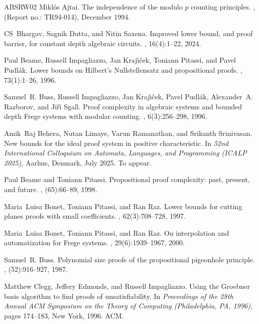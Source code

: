 \documentclass[11pt,letter]{article}
\theoremstyle{remark} %
\let\etalchar\relax %
\begin{document}
{\begin{thebibliography}{ABSRW02}
Mikl\'{o}s Ajtai.
\newblock The independence of the modulo $p$ counting principles.
, (Report no.: TR94-014), December 1994.

CS~Bhargav, Sagnik Dutta, and Nitin Saxena.
\newblock Improved lower bound, and proof barrier, for constant depth algebraic circuits.
, 16(4):1--22, 2024.

\bibitem[BIK{\etalchar{+}}96a]{BeameIKPP96}
Paul Beame, Russell Impagliazzo, Jan Kraj{\'{\i}}{\v{c}}ek, Toniann Pitassi, and Pavel Pudl{\'a}k.
\newblock Lower bounds on {H}ilbert's {N}ullstellensatz and propositional proofs.
, 73(1):1--26, 1996.

\bibitem[BIK{\etalchar{+}}96b]{BussIKPRS96}
Samuel~R. Buss, Russell Impagliazzo, Jan Kraj{\'{\i}}{\v{c}}ek, Pavel Pudl{\'{a}}k, Alexander~A. Razborov, and Ji{\v{r}}{\'{\i}} Sgall.
\newblock Proof complexity in algebraic systems and bounded depth {F}rege systems with modular counting.
, 6(3):256--298, 1996.

Amik~Raj Behera, Nutan Limaye, Varun Ramanathan, and Srikanth Srinivasan.
\newblock New bounds for the ideal proof system in positive characteristic.
\newblock In {\em 52nd International Colloquium on Automata, Languages, and Programming (ICALP 2025)}, Aarhus, Denmark, July 2025.
\newblock To appear.

Paul Beame and Toniann Pitassi.
\newblock Propositional proof complexity: past, present, and future.
, (65):66--89, 1998.

Maria~Luisa Bonet, Toniann Pitassi, and Ran Raz.
\newblock Lower bounds for cutting planes proofs with small coefficients.
, 62(3):708--728, 1997.

Maria~Luisa Bonet, Toniann Pitassi, and Ran Raz.
\newblock On interpolation and automatization for {F}rege systems.
, 29(6):1939--1967, 2000.

Samuel~R. Buss.
\newblock Polynomial size proofs of the propositional pigeonhole principle.
, (52):916--927, 1987.

Matthew Clegg, Jeffery Edmonds, and Russell Impagliazzo.
\newblock Using the {G}roebner basis algorithm to find proofs of unsatisfiability.
\newblock In {\em Proceedings of the 28th Annual ACM Symposium on the Theory of Computing (Philadelphia, PA, 1996)}, pages 174--183, New York, 1996. ACM.


\end{thebibliography}}
\end{document}
